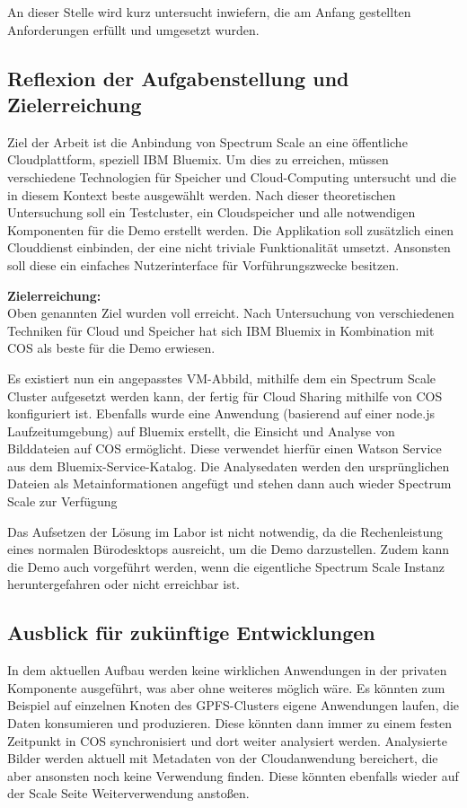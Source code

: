 An dieser Stelle wird kurz untersucht inwiefern, die am Anfang gestellten Anforderungen erfüllt und umgesetzt wurden.

\subsection{Reflexion der Aufgabenstellung und Zielerreichung}

Ziel der Arbeit ist die Anbindung von Spectrum Scale an eine öffentliche Cloudplattform, speziell IBM Bluemix. Um dies zu erreichen, müssen verschiedene Technologien für Speicher und Cloud-Computing untersucht und die in diesem Kontext beste ausgewählt werden. Nach dieser theoretischen Untersuchung soll ein Testcluster, ein Cloudspeicher und alle notwendigen Komponenten für die Demo erstellt werden.
Die Applikation soll zusätzlich einen Clouddienst einbinden, der eine nicht triviale Funktionalität umsetzt. Ansonsten soll diese ein einfaches Nutzerinterface für Vorführungszwecke besitzen.

\textbf{Zielerreichung:}\\
Oben genannten Ziel wurden voll erreicht. Nach Untersuchung von verschiedenen Techniken für Cloud und Speicher hat sich IBM Bluemix in Kombination mit \ac{COS} als beste für die Demo erwiesen. 

Es existiert nun ein angepasstes VM-Abbild, mithilfe dem ein Spectrum Scale Cluster aufgesetzt werden kann, der fertig für Cloud Sharing mithilfe von \acl{COS} konfiguriert ist. Ebenfalls wurde eine Anwendung (basierend auf einer node.js Laufzeitumgebung) auf Bluemix erstellt, die Einsicht und Analyse von Bilddateien auf \ac{COS} ermöglicht. Diese verwendet hierfür einen Watson Service aus dem Bluemix-Service-Katalog. Die Analysedaten werden den ursprünglichen Dateien als Metainformationen angefügt und stehen dann auch wieder Spectrum Scale zur Verfügung 

Das Aufsetzen der Lösung im Labor ist nicht notwendig, da die Rechenleistung eines normalen Bürodesktops ausreicht, um die Demo darzustellen. Zudem kann die Demo auch vorgeführt werden, wenn die eigentliche Spectrum Scale Instanz heruntergefahren oder nicht erreichbar ist.

\subsection{Ausblick für zukünftige Entwicklungen}
In dem aktuellen Aufbau werden keine wirklichen Anwendungen in der privaten Komponente ausgeführt, was aber ohne weiteres möglich wäre. Es könnten zum Beispiel auf einzelnen Knoten des GPFS-Clusters eigene Anwendungen laufen, die Daten konsumieren und produzieren. Diese könnten dann immer zu einem festen Zeitpunkt in \ac{COS} synchronisiert und dort weiter analysiert werden.
Analysierte Bilder werden aktuell mit Metadaten von der Cloudanwendung bereichert, die aber ansonsten noch keine Verwendung finden. Diese könnten ebenfalls wieder auf der Scale Seite Weiterverwendung anstoßen. 

